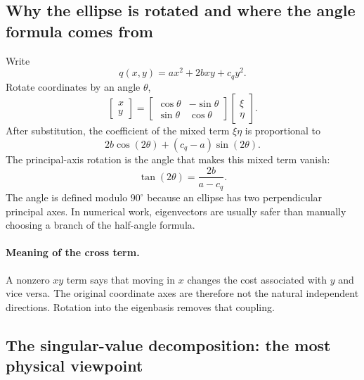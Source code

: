 \documentclass[11pt,a4paper]{article}
\begin{document}
\subsection{Why the ellipse is rotated and where the angle formula comes from}

Write
\begin{equation}
  q(x,y)=a x^2+2bxy+c_q y^2.
\end{equation}
Rotate coordinates by an angle $\theta$,
\begin{equation}
  \begin{bmatrix}x\\y\end{bmatrix}
  =
  \begin{bmatrix}
  \cos\theta&-\sin\theta\\
  \sin\theta&\cos\theta
  \end{bmatrix}
  \begin{bmatrix}\xi\\\eta\end{bmatrix}.
\end{equation}
After substitution, the coefficient of the mixed term $\xi\eta$ is proportional to
\begin{equation}
  2b\cos(2\theta)+(c_q-a)\sin(2\theta).
\end{equation}
The principal-axis rotation is the angle that makes this mixed term vanish:
\begin{equation}
  \tan(2\theta)=\frac{2b}{a-c_q}.
  \label{eq:rotation-angle-general}
\end{equation}
The angle is defined modulo $90^\circ$ because an ellipse has two perpendicular principal axes. In numerical work, eigenvectors are usually safer than manually choosing a branch of the half-angle formula.

\paragraph{Meaning of the cross term.}
A nonzero $xy$ term says that moving in $x$ changes the cost associated with $y$ and vice versa. The original coordinate axes are therefore not the natural independent directions. Rotation into the eigenbasis removes that coupling.

\subsection{The singular-value decomposition: the most physical viewpoint}
\end{document}
